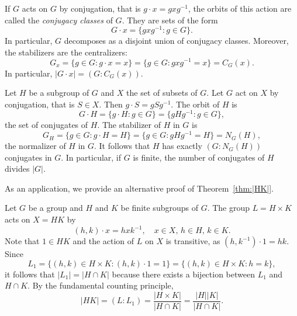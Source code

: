 \begin{example}
    If $G$ acts on $G$ by conjugation, that is $g\cdot x=gxg^{-1}$, the orbits of this action are called the \emph{conjugacy classes} 
    of $G$. They are sets of the form
        \[
        G\cdot x=\{gxg^{-1}:g\in G\}.
        \]
    In particular, $G$ decomposes as a disjoint union of conjugacy classes. Moreover, 
    the stabilizers are the centralizers:
        \[
        G_x=\{g\in G:g\cdot x=x\}=\{g\in G:gxg^{-1}=x\}=C_G(x).
        \]
    In particular, $|G\cdot x|=(G:C_G(x))$.
\end{example}

\begin{example}
\label{xca:counting_conjugates}
    Let $H$ be a subgroup of $G$ and $X$ the set of subsets of $G$. Let $G$ act on 
    $X$ by conjugation, that is $S\in X$. Then
        $g\cdot S=gSg^{-1}$. The orbit of $H$ 
        is 
        \[
        G\cdot H=\{g\cdot H:g\in G\}=\{gHg^{-1}:g\in G\},
        \]
        the set of conjugates of $H$. The stabilizer of $H$ in $G$ 
        is 
        \[
        G_H=\{g\in G:g\cdot H=H\}=\{g\in G:gHg^{-1}=H\}=N_G(H),
        \]
        the normalizer of $H$ in $G$. It follows that
        $H$ has exactly $(G:N_G(H))$ conjugates in $G$. In particular,
        if $G$ is finite, 
        the number of conjugates of $H$ divides $|G|$. 
\end{example}

As an application, we provide an alternative proof
of Theorem~\ref{thm:|HK|}. 

\begin{example}
\label{exa:for_HK}
Let $G$ be a group and $H$ and $K$ be finite subgroups of $G$. 
The group $L=H\times K$ acts on $X=HK$ by 
\[
(h,k)\cdot x=hxk^{-1},\quad x\in X,\,h\in H,\,k\in K.
\]
Note that $1\in HK$ and the action of $L$ on $X$ is transitive, as 
$(h,k^{-1})\cdot 1 = hk$. Since 
\[
L_1=\{(h,k)\in H\times K: (h,k)\cdot 1=1\}=\{(h,k)\in H\times K:h=k\},
\]
it follows that $|L_1|=|H\cap K|$ because there exists a bijection
between $L_1$ and 
$H\cap K$. By the fundamental counting principle, 
\[
|HK|=(L:L_1)=\frac{|H\times K|}{|H\cap K|}=\frac{|H||K|}{|H\cap K|}.
\]
\end{example}
